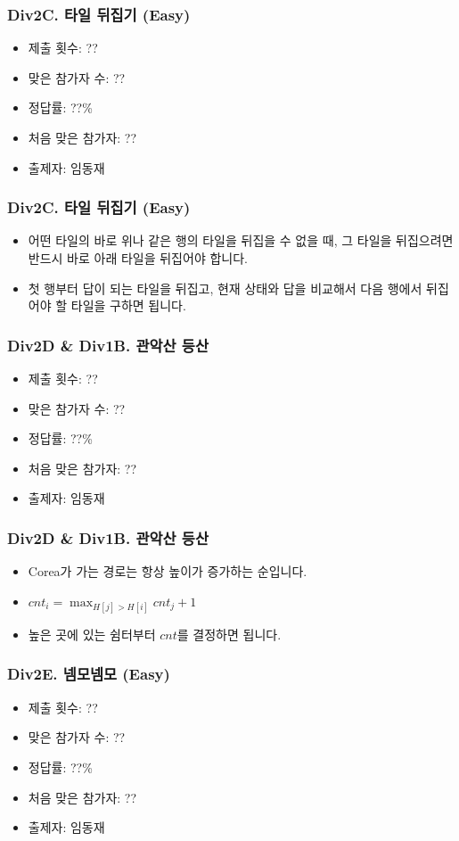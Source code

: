 \documentclass[xetex]{beamer}
\begin{document}
\begin{frame}
  \frametitle{Div2C. 타일 뒤집기 (Easy)}
  \begin{itemize}
    \item 제출 횟수: ??
    \item 맞은 참가자 수: ??
    \item 정답률: ??\%
    \item 처음 맞은 참가자: ??
    \item 출제자: 임동재
  \end{itemize}
\end{frame}

\begin{frame}
  \frametitle{Div2C. 타일 뒤집기 (Easy)}
  \begin{itemize}
    \item 어떤 타일의 바로 위나 같은 행의 타일을 뒤집을 수 없을 때, 그 타일을 뒤집으려면 반드시 바로 아래 타일을 뒤집어야 합니다.
    \item 첫 행부터 답이 되는 타일을 뒤집고, 현재 상태와 답을 비교해서 다음 행에서 뒤집어야 할 타일을 구하면 됩니다.
  \end{itemize}
\end{frame}

\begin{frame}
  \frametitle{Div2D \& Div1B. 관악산 등산}
  \begin{itemize}
    \item 제출 횟수: ??
    \item 맞은 참가자 수: ??
    \item 정답률: ??\%
    \item 처음 맞은 참가자: ??
    \item 출제자: 임동재
  \end{itemize}
\end{frame}

\begin{frame}
  \frametitle{Div2D \& Div1B. 관악산 등산}
  \begin{itemize}
    \item Corea가 가는 경로는 항상 높이가 증가하는 순입니다.
    \item $cnt_{i} = \max_{H[j] > H[i]} cnt_{j} + 1$
    \item 높은 곳에 있는 쉼터부터 $cnt$를 결정하면 됩니다.
  \end{itemize}
\end{frame}

\begin{frame}
  \frametitle{Div2E. 넴모넴모 (Easy)}
  \begin{itemize}
    \item 제출 횟수: ??
    \item 맞은 참가자 수: ??
    \item 정답률: ??\%
    \item 처음 맞은 참가자: ??
    \item 출제자: 임동재
  \end{itemize}
\end{frame}
\end{document}
